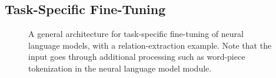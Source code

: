 \documentclass[acmlarge,screen,nonacm]{acmart}
\begin{document}
\subsection{Task-Specific Fine-Tuning}
\label{sec:fine-tuning}

\begin{figure}
    \centering

    \caption{A general architecture for task-specific fine-tuning of neural language models, with a relation-extraction example. Note that the input goes through additional processing such as word-piece tokenization in the neural language model module.
}
    \label{fig:fine-tuning}
\end{figure}
\end{document}
